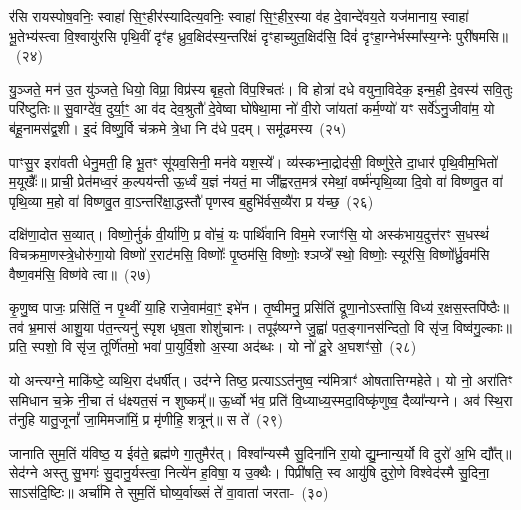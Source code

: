 र॑सि रायस्पोष॒वनिः॒ स्वाहा॑ सि॒ꣳ॒हीर॑स्यादित्य॒वनिः॒ स्वाहा॑ सि॒ꣳ॒हीर॒स्या व॑ह दे॒वान्दे॑वय॒ते यज॑मानाय॒ स्वाहा॑ भू॒तेभ्य॑स्त्वा वि॒श्वायु॑रसि पृथि॒वीं दृꣳ॑ह ध्रुव॒क्षिद॑स्य॒न्तरि॑क्षं दृꣳहाच्युत॒क्षिद॑सि॒ दिवं॑ दृꣳहा॒ग्नेर्भस्मा᳚स्य॒ग्नेः पुरी॑षमसि॥~(२४)\ip

{\anuvakamend[{नाम॑ सुप्रजा॒वनिः॒ स्वाहा॑ सि॒ꣳ॒हीः पञ्च॑त्रिꣳशच्च}]}%

यु॒ञ्जते॒ मन॑ उ॒त यु॑ञ्जते॒ धियो॒ विप्रा॒ विप्र॑स्य बृह॒तो वि॑प॒श्चितः॑। वि होत्रा॑ दधे वयुना॒विदेक॒ इन्म॒ही दे॒वस्य॑ सवि॒तुः परि॑ष्टुतिः॥ सु॒वाग्दे॑व॒ दुर्या॒ꣳ॒ आ व॑द देव॒श्रुतौ॑ दे॒वेष्वा घो॑षेथा॒मा नो॑ वी॒रो जा॑यतां कर्म॒ण्यो॑ यꣳ सर्वे॑\-ऽनु॒जीवा॑म॒ यो ब॑हू॒नामस॑द्व॒शी। इ॒दं विष्णु॒र्वि च॑क्रमे त्रे॒धा नि द॑धे प॒दम्। समू॑ढमस्य~(२५)\ip

पाꣳसु॒र इरा॑वती धेनु॒मती॒ हि भू॒तꣳ सू॑यव॒सिनी॒ मन॑वे यश॒स्ये᳚। व्य॑स्कभ्ना॒द्रोद॑सी॒ विष्णु॑रे॒ते दा॒धार॑ पृथि॒वीम॒भितो॑ म॒यूखैः᳚॥ प्राची॒ प्रेत॑मध्व॒रं क॒ल्पय॑न्ती ऊ॒र्ध्वं य॒ज्ञं न॑यतं॒ मा जी᳚ह्वरत॒मत्र॑ रमेथां॒ वर्ष्म॑न्पृथि॒व्या दि॒वो वा॑ विष्णवु॒त वा॑ पृथि॒व्या म॒हो वा॑ विष्णवु॒त वा॒\-ऽन्तरि॑क्षा॒द्धस्तौ॑ पृणस्व ब॒हुभि॑र्वस॒व्यै॑रा प्र य॑च्छ॒~(२६)\ip

दक्षि॑णा॒दोत स॒व्यात्। विष्णो॒र्नुकं॑ वी॒र्या॑णि॒ प्र वो॑चं॒ यः पार्थि॑वानि विम॒मे रजाꣳ॑सि॒ यो अस्क॑भाय॒दुत्त॑रꣳ स॒धस्थं॑ विचक्रमा॒णस्त्रे॒धोरु॑गा॒यो विष्णो॑ र॒राट॑मसि॒ विष्णोः᳚ पृ॒ष्ठम॑सि॒ विष्णोः॒ श्ञप्त्रे᳚ स्थो॒ विष्णोः॒ स्यूर॑सि॒ विष्णो᳚र्ध्रु॒वम॑सि वैष्ण॒वम॑सि॒ विष्ण॑वे त्वा॥~(२७)\ip

{\anuvakamend[{अ॒स्य॒ य॒च्छैका॒न्नच॑त्वारि॒ꣳ॒शच्च॑}]}%

कृ॒णु॒ष्व पाजः॒ प्रसि॑तिं॒ न पृ॒थ्वीं या॒हि राजे॒वाम॑वा॒ꣳ॒ इभे॑न। तृ॒ष्वीमनु॒ प्रसि॑तिं द्रूणा॒नो\-ऽस्ता॑सि॒ विध्य॑ र॒क्षस॒स्तपि॑ष्ठैः॥ तव॑ भ्र॒मास॑ आशु॒या प॑त॒न्त्यनु॑ स्पृश धृष॒ता शोशु॑चानः। तपूꣴ॑ष्यग्ने जु॒ह्वा॑ पत॒ङ्गानस॑न्दितो॒ वि सृ॑ज॒ विष्व॑गु॒ल्काः॥ प्रति॒ स्पशो॒ वि सृ॑ज॒ तूर्णि॑तमो॒ भवा॑ पा॒युर्वि॒शो अ॒स्या अद॑ब्धः। यो नो॑ दू॒रे अ॒घशꣳ॑सो॒~(२८)\ip

यो अन्त्यग्ने॒ माकि॑ष्टे॒ व्यथि॒रा द॑धर्षीत्। उद॑ग्ने तिष्ठ॒ प्रत्या\-ऽऽ\-त॑नुष्व॒ न्य॑मित्राꣳ॑ ओषतात्तिग्महेते। यो नो॒ अरा॑तिꣳ समिधान च॒क्रे नी॒चा तं ध॑क्ष्यत॒सं न शुष्कम्᳚॥ ऊ॒र्ध्वो भ॑व॒ प्रति॑ वि॒ध्याध्य॒स्मदा॒विष्कृ॑णुष्व॒ दैव्या᳚न्यग्ने। अव॑ स्थि॒रा त॑नुहि यातु॒जूनां᳚ जा॒मिमजा॑मिं॒ प्र मृ॑णीहि॒ शत्रून्॑॥ स ते॑~(२९)\ip

जानाति सुम॒तिं य॑विष्ठ॒ य ईव॑ते॒ ब्रह्म॑णे गा॒तुमैर॑त्। विश्वा᳚न्यस्मै सु॒दिना॑नि रा॒यो द्यु॒म्नान्य॒र्यो वि दुरो॑ अ॒भि द्यौ᳚त्॥ सेद॑ग्ने अस्तु सु॒भगः॑ सु॒दानु॒र्यस्त्वा॒ नित्ये॑न ह॒विषा॒ य उ॒क्थैः। पिप्री॑षति॒ स्व आयु॑षि दुरो॒णे विश्वेद॑स्मै सु॒दिना॒ सा\-ऽस॑दि॒ष्टिः॥ अर्चा॑मि ते सुम॒तिं घोष्य॒र्वाख्सं ते॑ वा॒वाता॑ जरता-~(३०)\ip

